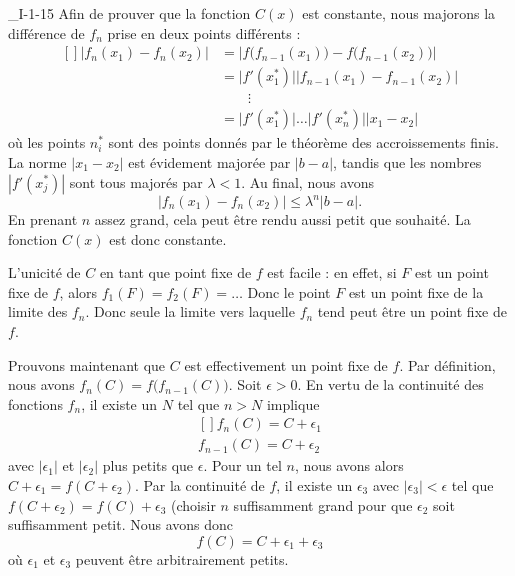 \begin{corrige}{_I-1-15}
Afin de prouver que la fonction $C(x)$ est constante, nous majorons la différence de $f_n$ prise en deux points différents :
\begin{equation}
	\begin{aligned}[]
		\big| f_n(x_1)-f_n(x_2)  \big|	&=	\Big|  f\big( f_{n-1}(x_1) \big) - f\big(f_{n-1}(x_2) \big)   \Big|\\
						&= \big| f'(x_1^*)\big|	\big|  f_{n-1}(x_1) - f_{n-1}(x_2)  \big|\\
						&\qquad\vdots\\
						&=\big| f'(x_1^*)\big|\ldots	\big| f'(x_n^*)\big|| x_1-x_2  \big|
	\end{aligned}
\end{equation}
où les points $n_i^*$ sont des points donnés par le théorème des accroissements finis. La norme $| x_1-x_{2} |$ est évidement majorée par $| b-a |$, tandis que les nombres $| f'(x^*_j) |$ sont tous majorés par $\lambda<1$. Au final, nous avons
\begin{equation}
	\big| f_n(x_1)-f_n(x_2)  \big|\leq \lambda^n| b-a |.
\end{equation}
En prenant $n$ assez grand, cela peut être rendu aussi petit que souhaité. La fonction $C(x)$ est donc constante.

L'unicité de $C$ en tant que point fixe de $f$ est facile : en effet, si $F$ est un point fixe de $f$, alors $f_1(F)=f_2(F)=\ldots$ Donc le point $F$ est un point fixe de la limite des $f_n$. Donc seule la limite vers laquelle $f_n$ tend peut être un point fixe de $f$.

Prouvons maintenant que $C$ est effectivement un point fixe de $f$. Par définition, nous avons $f_n(C)=f\big( f_{n-1}(C) \big)$. Soit $\epsilon>0$. En vertu de la continuité des fonctions $f_n$, il existe un $N$ tel que $n>N$ implique
\begin{equation}
	\begin{aligned}[]
		f_n(C)=C+\epsilon_1\\
		f_{n-1}(C)=C+\epsilon_2
	\end{aligned}
\end{equation}
avec $| \epsilon_1 |$ et $|\epsilon_2|$ plus petits que $\epsilon$. Pour un tel $n$, nous avons alors $C+\epsilon_1=f(C+\epsilon_2)$. Par la continuité de $f$, il existe un $\epsilon_3$ avec $| \epsilon_3 |<\epsilon$ tel que $f(C+\epsilon_2)=f(C)+\epsilon_3$ (choisir $n$ suffisamment grand pour que $\epsilon_2$ soit suffisamment petit. Nous avons donc
\begin{equation}
	f(C)=C+\epsilon_1+\epsilon_3
\end{equation}
où $\epsilon_1$ et $\epsilon_3$ peuvent être arbitrairement petits.

\end{corrige}
